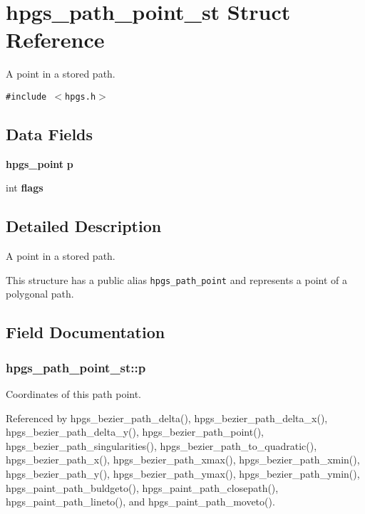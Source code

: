\section{hpgs\_\-path\_\-point\_\-st Struct Reference}
\label{structhpgs__path__point__st}
A point in a stored path.  


{\tt \#include $<$hpgs.h$>$}

\subsection*{Data Fields}
\begin{CompactItemize}
\item 
{\bf hpgs\_\-point} {\bf p}
\item 
int {\bf flags}
\end{CompactItemize}


\subsection{Detailed Description}
A point in a stored path. 

This structure has a public alias {\tt hpgs\_\-path\_\-point} and represents a point of a polygonal path. 

\subsection{Field Documentation}
\subsubsection[p]{ {\bf hpgs\_\-path\_\-point\_\-st::p}}\label{structhpgs__path__point__st_c89eeb90383204d79e177f60f99c5f5e}


Coordinates of this path point. 

Referenced by hpgs\_\-bezier\_\-path\_\-delta(), hpgs\_\-bezier\_\-path\_\-delta\_\-x(), hpgs\_\-bezier\_\-path\_\-delta\_\-y(), hpgs\_\-bezier\_\-path\_\-point(), hpgs\_\-bezier\_\-path\_\-singularities(), hpgs\_\-bezier\_\-path\_\-to\_\-quadratic(), hpgs\_\-bezier\_\-path\_\-x(), hpgs\_\-bezier\_\-path\_\-xmax(), hpgs\_\-bezier\_\-path\_\-xmin(), hpgs\_\-bezier\_\-path\_\-y(), hpgs\_\-bezier\_\-path\_\-ymax(), hpgs\_\-bezier\_\-path\_\-ymin(), hpgs\_\-paint\_\-path\_\-buldgeto(), hpgs\_\-paint\_\-path\_\-closepath(), hpgs\_\-paint\_\-path\_\-lineto(), and hpgs\_\-paint\_\-path\_\-moveto().
